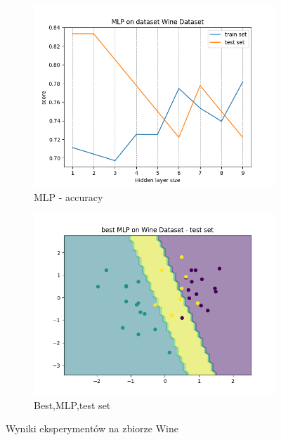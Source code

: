 \documentclass[12pt]{article}
\newcommand*{\subfigwidth}{0.24\textwidth}
\begin{document}
\begin{figure}[H]
\begin{subfigure}[t]{\subfigwidth}
        \includegraphics[width=\linewidth]{img/other_datasets/mlp/wine_accuracy.png}
        \caption{MLP - accuracy}
    \end{subfigure}
    \hfill
    \begin{subfigure}[t]{\subfigwidth}
        \includegraphics[width=\linewidth]{img/other_datasets/mlp/wine_best_boundary_test.png}
        \caption{Best,MLP,test set}
    \end{subfigure}
    \caption{Wyniki eksperymentów na zbiorze Wine}
\end{figure}
\end{document}
